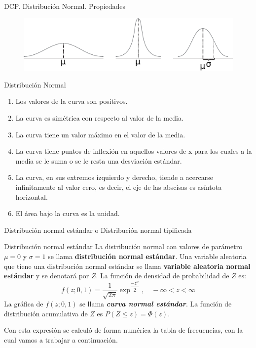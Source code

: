 \documentclass[11pt]{beamer}
\begin{document}
      \begin{frame}{DCP. Distribución Normal. Propiedades}
          \begin{figure}
              \centering
              \includegraphics[width=0.55\linewidth]{images/estadistica11}
              \label{fig:estadistica11}
          \end{figure}

          \begin{block}{Distribuci\'on Normal}
             \begin{enumerate}
                 \item Los valores de la curva son positivos.
                 \item La curva es simétrica con respecto al valor de la media.
                 \item La curva tiene un valor máximo en el valor de la media.
                 \item La curva tiene puntos de inflexión en aquellos valores de x para los cuales a la media se le suma o se le resta una desviación estándar.
                 \item La curva, en sus extremos izquierdo y derecho, tiende a acercarse infinitamente al valor cero, es decir, el eje de las abscisas es asíntota horizontal.
                 \item El área bajo la curva es la unidad.
             \end{enumerate}
          \end{block}
      \end{frame}

      \begin{frame}{Distribución normal estándar o Distribución normal tipificada}
        \begin{block}{Distribución normal estándar}
          La distribución normal con valores de parámetro $\mu = 0$ y $\sigma = 1$ se llama \textbf{distribución normal estándar}. Una variable aleatoria que tiene una distribución normal estándar se llama \textbf{variable aleatoria normal estándar} y se denotará por $Z$. La función
de densidad de probabilidad de $Z$ es:
           $$f(z; 0, 1) = \dfrac{1}{\sqrt{2\pi}} \exp^{\dfrac{-z^2}{2}} ,\quad -\infty < z < \infty$$
           La gráfica de $f(z; 0, 1)$ se llama \textbf{\textit{curva normal estándar}}. La función de distribución acumulativa de $Z$ es $P(Z\leq z) = \Phi(z)$.
        \end{block}
        Con esta expresión se calcul\'o de forma numérica la tabla de frecuencias, con la cual vamos a trabajar a continuación.
      \end{frame}
\end{document}

